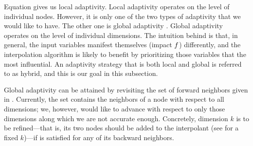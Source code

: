 Equation  gives us local adaptivity. Local adaptivity operates on
the level of individual nodes. However, it is only one of the two types of
adaptivity that we would like to have. The other one is global adaptivity
\cite{klimke2006}. Global adaptivity operates on the level of individual
dimensions. The intuition behind is that, in general, the input variables
manifest themselves (impact $f$) differently, and the interpolation algorithm
is likely to benefit by prioritizing those variables that the most influential.
An adaptivity strategy that is both local and global is referred to as hybrid,
and this is our goal in this subsection.

Global adaptivity can be attained by revisiting the set of forward neighbors
given in . Currently, the set contains the neighbors of a node
with respect to all dimensions; we, however, would like to advance with respect
to only those dimensions along which we are not accurate enough. Concretely,
dimension $k$ is to be refined---that is, its two nodes should be added to the
interpolant (see  for a fixed $k$)---if  is
satisfied for any of its backward neighbors.
